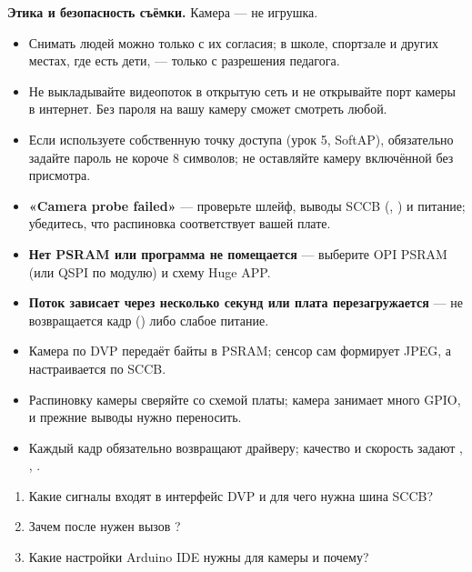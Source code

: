 \begin{caution}
\textbf{Этика и безопасность съёмки.} Камера --- не игрушка.
\begin{itemize}[leftmargin=*]
  \item Снимать людей можно только с их согласия; в школе, спортзале и других местах, где есть дети,
        --- только с разрешения педагога.
  \item Не выкладывайте видеопоток в открытую сеть и не открывайте порт камеры в интернет. Без пароля
        на вашу камеру сможет смотреть любой.
  \item Если используете собственную точку доступа (урок 5, SoftAP), обязательно задайте пароль
        не короче 8 символов; не оставляйте камеру включённой без присмотра.
\end{itemize}
\end{caution}

\begin{trouble}
\begin{itemize}[leftmargin=*]
  \item \textbf{«Camera probe failed»} --- проверьте шлейф, выводы SCCB (, ) и питание; убедитесь, что распиновка соответствует вашей плате.
  \item \textbf{Нет PSRAM или программа не помещается} --- выберите \textsf{OPI PSRAM} (или QSPI по модулю) и схему \textsf{Huge APP}.
  \item \textbf{Поток зависает через несколько секунд или плата перезагружается} --- не возвращается кадр () либо слабое питание.
\end{itemize}
\end{trouble}

\begin{summary}
\begin{itemize}[leftmargin=*]
  \item Камера по DVP передаёт байты в PSRAM; сенсор сам формирует JPEG, а настраивается по SCCB.
  \item Распиновку камеры сверяйте со схемой платы; камера занимает много GPIO, и прежние выводы нужно переносить.
  \item Каждый кадр обязательно возвращают драйверу; качество и скорость задают , , .
\end{itemize}
\end{summary}

\begin{selfcheck}
\begin{enumerate}
  \item Какие сигналы входят в интерфейс DVP и для чего нужна шина SCCB?
  \item Зачем после  нужен вызов ?
  \item Какие настройки Arduino IDE нужны для камеры и почему?
\end{enumerate}
\end{selfcheck}

